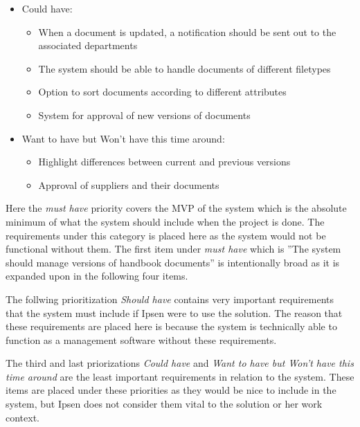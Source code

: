 \begin{itemize}
\begin{itemize}
        \end{itemize}
    \item Could have:
        \begin{itemize}
            \item When a document is updated, a notification should be sent out to the associated departments
            \item The system should be able to handle documents of different filetypes
            \item Option to sort documents according to different attributes
            \item System for approval of new versions of documents
        \end{itemize}
    \item Want to have but Won't have this time around:
        \begin{itemize}
            \item Highlight differences between current and previous versions
            \item Approval of suppliers and their documents
        \end{itemize}
\end{itemize}

Here the \textit{must have} priority covers the MVP of the system which is the absolute minimum of what the system should include when the project is done.
The requirements under this category is placed here as the system would not be functional without them.
The first item under \textit{must have} which is ''The system should manage versions of handbook documents'' is intentionally broad as it is expanded upon in the following four items.

The follwing prioritization \textit{Should have} contains very important requirements that the system must include if Ipsen were to use the solution.
The reason that these requirements are placed here is because the system is technically able to function as a management software without these requirements.

The third and last priorizations \textit{Could have} and \textit{Want to have but Won't have this time around} are the least important requirements in relation to the system.
These items are placed under these priorities as they would be nice to include in the system, but Ipsen does not consider them vital to the solution or her work context.
